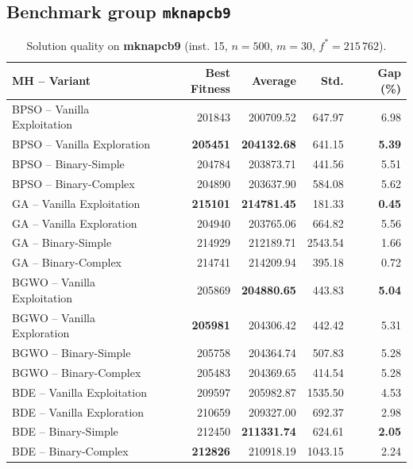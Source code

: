 \documentclass[journal,article,submit,moreauthors]{Definitions/mdpi}
\begin{document}
\clearpage
\subsection{Benchmark group \texttt{mknapcb9}}

\begin{table}[htbp]
  \centering
  \small
  \caption{Solution quality on \textbf{mknapcb9} (inst. 15, $n=500$, $m=30$, $f^*=215\,762$).}
  \label{tab:calidad_mknapcb9_15}
  \begin{tabular}{lrrrr}
    \toprule
    \textbf{MH -- Variant} &
    \textbf{Best Fitness} &
    \textbf{Average} &
    \textbf{Std.} &
    \textbf{Gap (\%)} \\
    \midrule
    BPSO -- Vanilla Exploitation &         201843 &        200709.52 & 647.97 &         6.98 \\
    BPSO -- Vanilla Exploration  & \textbf{205451} & \textbf{204132.68} & 641.15 & \textbf{5.39} \\
    BPSO -- Binary-Simple        &         204784 &        203873.71 & 441.56 &         5.51 \\
    BPSO -- Binary-Complex       &         204890 &        203637.90 & 584.08 &         5.62 \\
    \midrule
    GA -- Vanilla Exploitation   & \textbf{215101} & \textbf{214781.45} & 181.33 & \textbf{0.45} \\
    GA -- Vanilla Exploration    &         204940 &        203765.06 & 664.82 &         5.56 \\
    GA -- Binary-Simple          &         214929 &        212189.71 & 2543.54 &         1.66 \\
    GA -- Binary-Complex         &         214741 &        214209.94 & 395.18 &         0.72 \\
    \midrule
    BGWO -- Vanilla Exploitation &         205869 & \textbf{204880.65} & 443.83 & \textbf{5.04} \\
    BGWO -- Vanilla Exploration  & \textbf{205981} &        204306.42 & 442.42 &         5.31 \\
    BGWO -- Binary-Simple        &         205758 &        204364.74 & 507.83 &         5.28 \\
    BGWO -- Binary-Complex       &         205483 &        204369.65 & 414.54 &         5.28 \\
    \midrule
    BDE -- Vanilla Exploitation  &         209597 &        205982.87 & 1535.50 &         4.53 \\
    BDE -- Vanilla Exploration   &         210659 &        209327.00 & 692.37 &         2.98 \\
    BDE -- Binary-Simple         &         212450 & \textbf{211331.74} & 624.61 & \textbf{2.05} \\
    BDE -- Binary-Complex        & \textbf{212826} &        210918.19 & 1043.15 &         2.24 \\
    \bottomrule
  \end{tabular}
\end{table}
\end{document}
